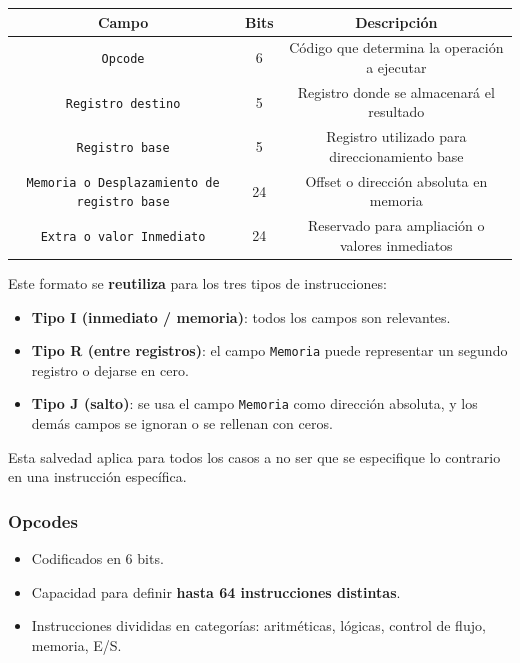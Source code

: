 \documentclass{article}
\begin{document}
\begin{table}[h!]
    \centering
    \begin{tabular}{|c|c|c|}
    \hline
    \textbf{Campo} & \textbf{Bits} & \textbf{Descripción} \\
    \hline
    \texttt{Opcode} & 6 & Código que determina la operación a ejecutar \\
    \texttt{Registro destino} & 5 & Registro donde se almacenará el resultado \\
    \texttt{Registro base} & 5 & Registro utilizado para direccionamiento base \\
    \texttt{Memoria o Desplazamiento de registro base} & 24 & Offset o dirección absoluta en memoria \\
    \texttt{Extra o valor Inmediato} & 24 & Reservado para ampliación o valores inmediatos \\
    \hline
    \end{tabular}
\end{table}

Este formato se \textbf{reutiliza} para los tres tipos de instrucciones:

\begin{itemize}
    \item \textbf{Tipo I (inmediato / memoria)}: todos los campos son relevantes.
    \item \textbf{Tipo R (entre registros)}: el campo \texttt{Memoria} puede representar un segundo registro o dejarse en cero.
    \item \textbf{Tipo J (salto)}: se usa el campo \texttt{Memoria} como dirección absoluta, y los demás campos se ignoran o se rellenan con ceros.
\end{itemize}

Esta salvedad aplica para todos los casos a no ser que se especifique lo contrario en una instrucción específica.

\subsubsection{Opcodes}

\begin{itemize}
    \item Codificados en 6 bits.
    \item Capacidad para definir \textbf{hasta 64 instrucciones distintas}.
    \item Instrucciones divididas en categorías: aritméticas, lógicas, control de flujo, memoria, E/S.
\end{itemize}
\end{document}
